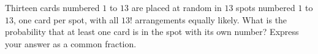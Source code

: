 Thirteen cards numbered $1$ to $13$ are placed at random in $13$ spots numbered $1$ to $13$, one card per spot, with all $13!$ arrangements equally likely. What is the probability that at least one card is in the spot with its own number? Express your answer as a common fraction.
